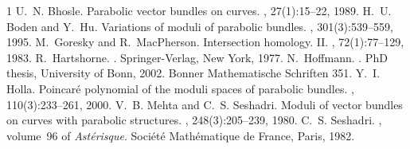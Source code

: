 \documentclass{article}
\begin{document}
\begin{thebibliography}{1}
   U.~N. Bhosle. \newblock Parabolic vector bundles on curves. , 27(1):15--22, 1989.
   H.~U. Boden and Y.~Hu. \newblock Variations of moduli of parabolic bundles. , 301(3):539--559, 1995.
   M.~Goresky and R.~MacPherson. \newblock Intersection homology. {II}. , 72(1):77--129, 1983.
   R.~Hartshorne. . \newblock Springer-Verlag, New York, 1977.
   N.~Hoffmann. . \newblock PhD thesis, University of Bonn, 2002.
    \newblock Bonner Mathematische Schriften 351.
   Y.~I. Holla. \newblock Poincar\'e polynomial of the moduli spaces of parabolic bundles.
    , 110(3):233--261, 2000.
   V.~B. Mehta and C.~S. Seshadri. \newblock Moduli of vector bundles on curves with parabolic structures.
    , 248(3):205--239, 1980.
   C.~S. Seshadri. , volume~96 of {\em Ast\'erisque}.
    \newblock Soci\'et\'e Math\'ematique de France, Paris, 1982.
\end{thebibliography}
\end{document}
